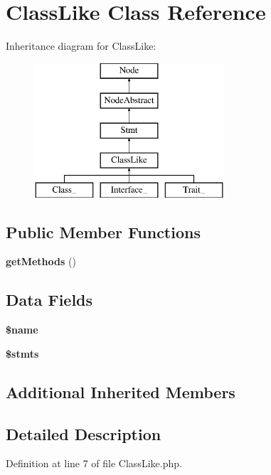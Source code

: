 \section{Class\+Like Class Reference}
\label{class_php_parser_1_1_node_1_1_stmt_1_1_class_like}
Inheritance diagram for Class\+Like\+:\begin{figure}[H]
\begin{center}
\leavevmode
\includegraphics[height=5.000000cm]{class_php_parser_1_1_node_1_1_stmt_1_1_class_like}
\end{center}
\end{figure}
\subsection*{Public Member Functions}
\begin{DoxyCompactItemize}
\item 
{\bf get\+Methods} ()
\end{DoxyCompactItemize}
\subsection*{Data Fields}
\begin{DoxyCompactItemize}
\item 
{\bf \$name}
\item 
{\bf \$stmts}
\end{DoxyCompactItemize}
\subsection*{Additional Inherited Members}


\subsection{Detailed Description}


Definition at line 7 of file Class\+Like.\+php.



